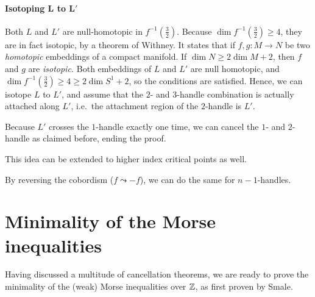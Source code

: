 \begin{myproof}
    \paragraph{Isotoping $\bm{L}$ to $\bm{L'}$}
    Both $L$ and $L'$ are null-homotopic in  $f^{-1}(\frac{3}{2})$.
    Because $\dim f^{-1}(\frac{3}{2}) \ge 4$, they are in fact isotopic, by a theorem of Withney.
    It states that if $f, g: M \to N$ be two \emph{homotopic} embeddings of a compact manifold. If $\dim N \ge  2 \dim M + 2$, then $f$ and  $g$ are \emph{isotopic.}
    Both embeddings of $L$ and  $L'$ are null homotopic, and  $\dim f^{-1}(\frac{3}{2}) \ge 4 \ge  2 \dim S^{1} +  2$, so the conditions are satisfied.
    Hence, we can isotope $L$ to $L'$, and assume that the $2$- and  $3$-handle combination is actually attached along $L'$, i.e.\ the attachment region of the $2$-handle is $L'$.

    Because $L'$ crosses the  $1$-handle exactly one time, we can cancel the $1$- and $2$-handle as claimed before, ending the proof.
\end{myproof}
\begin{remark}
    This idea can be extended to higher index critical points as well.
\end{remark}
\begin{remark}
    By reversing the cobordism ($f \leadsto -f$), we can do the same for $n-1$-handles.
\end{remark}

\section{Minimality of the Morse inequalities}
\label{sec:minimality}

Having discussed a multitude of cancellation theorems, we are ready to prove the minimality of the (weak) Morse inequalities over $\mathbb{Z}$, as first proven by Smale.

